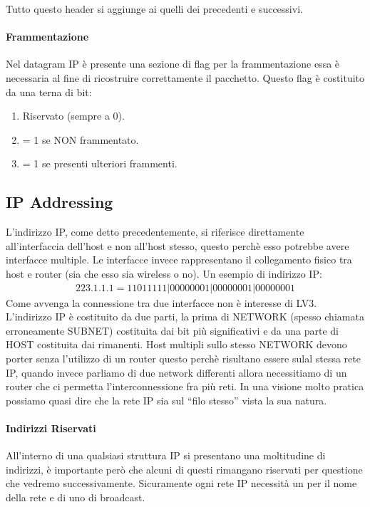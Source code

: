 \documentclass[12pt]{article}
\begin{document}
Tutto questo header si aggiunge ai quelli dei precedenti e successivi. %

\paragraph{Frammentazione} Nel datagram IP è presente una sezione di flag per la frammentazione essa è necessaria al fine di ricostruire correttamente il pacchetto. Questo flag è costituito da una terna di bit:
\begin{enumerate}
  \item Riservato (sempre a 0).
  \item = 1 se NON frammentato.
  \item = 1 se presenti ulteriori frammenti.
\end{enumerate}

\subsection{IP Addressing} %
L'indirizzo IP, come detto precedentemente, si riferisce direttamente all'interfaccia dell'host e non all'host stesso, questo perchè esso potrebbe avere interfacce multiple. Le interfacce invece rappresentano il collegamento fisico tra host e router (sia che esso sia wireless o no). Un esempio di indirizzo IP:
\begin{equation}
  \begin{gathered}
    223.1.1.1 = 11011111|00000001|00000001|00000001
    \label{eq:ipv4bit}
  \end{gathered}
\end{equation}
Come avvenga la connessione tra due interfacce non è interesse di LV3.\\
L'indirizzo IP è costituito da due parti, la prima di NETWORK (spesso chiamata erroneamente SUBNET) costituita dai bit più significativi e da una parte di HOST costituita dai rimanenti. Host multipli sullo stesso NETWORK devono porter senza l'utilizzo di un router questo perchè risultano essere sulal stessa rete IP, quando invece parliamo di due network differenti allora necessitiamo di un router che ci permetta l'interconnessione fra più reti. In una visione molto pratica possiamo quasi dire che la rete IP sia sul ``filo stesso'' vista la sua natura.
\paragraph{Indirizzi Riservati} All'interno di una qualsiasi struttura IP si presentano una moltitudine di indirizzi, è importante però che alcuni di questi rimangano riservati per questione che vedremo successivamente. Sicuramente ogni rete IP necessità un per il nome della rete e di uno di broadcast.
\end{document}
